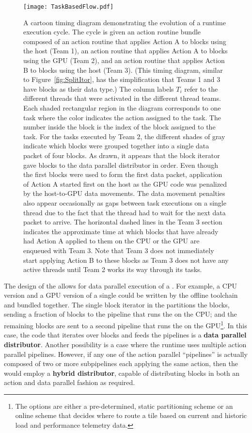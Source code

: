 \documentclass{article}
\begin{document}
\begin{figure}[!hp]
\begin{center}
\texttt{[image: TaskBasedFlow.pdf]}
\caption[]{A cartoon timing diagram demonstrating the evolution of a runtime
execution cycle. The cycle is given an action routine bundle composed of an action
routine that applies Action A to blocks using the host (Team 1), an action routine that
applies Action A to blocks using the GPU (Team 2), and an action routine that applies
Action B to blocks using the host (Team 3).  (This timing diagram, similar to
Figure~\ref{fig:SplitItor}, has the simplification that
Teams 1 and 3 have blocks as their data type.) The column labels $T_i$ refer to
the different threads that were activated in the different thread teams.  Each shaded
rectangular region in the diagram corresponds to one task where the color
indicates the action assigned to the task. The number inside the block is the
index of the block assigned to the task.  For the tasks executed by Team 2, the
different shades of gray indicate which blocks were grouped together into a
single data packet of four blocks.  As drawn, it appears that the block
iterator gave blocks to the data parallel distributor in order.  Even though the
first blocks were used to form the first data packet, application of Action A
started first on the host as the GPU code was penalized by the host-to-GPU data
movements.  The data movement penalties also appear occasionally as gaps between
task executions on a single thread due to the fact that the thread had to wait
for the next data packet to arrive.  The horizontal dashed lines in the Team 3
section indicates the approximate time at which blocks that have already had
Action A applied to them on the CPU or the GPU are enqueued with Team 3.  Note
that Team 3 does not immediately start applying Action B to these blocks as
Team 3 does not have any active threads until Team 2 works its way through its
tasks.}
\label{fig:TaskBasedFlow}
\end{center}
\end{figure}

The design of the \OR allows for data parallel execution of a \taskcodebundle.
For example, a CPU version and a GPU version of a single \OLAR could be
written by the offline toolchain and bundled together.  The single block
iterator in the \OR partitions the blocks, sending a fraction of blocks
to the pipeline that runs the \actionroutine on the CPU;
and the remaining blocks are sent to a second pipeline that runs the \actionroutine on the
GPU\footnote{The options are either a pre-determined, static partitioning
scheme or an online scheme that decides where to route a tile based on current
and historic load and performance telemetry data.}.  In this case, the code that
iterates over blocks and feeds the pipelines is a \textbf{data parallel
distributor}.  Another possibility is a case where the runtime uses
multiple action parallel pipelines.  However, if any one of the action parallel
``pipelines'' is actually composed of two or more subpipelines each applying the
same action, then the \OR would employ a \textbf{hybrid distributor},
capable of distributing blocks in both an action and data parallel fashion as
required.\\
\end{document}
